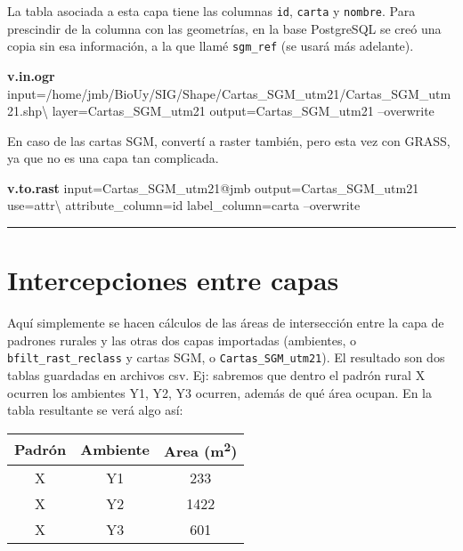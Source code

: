\documentclass[spanish,]{article}
\newenvironment{Shaded}{}{}
\newcommand{\KeywordTok}[1]{\textcolor[rgb]{0.00,0.44,0.13}{\textbf{{#1}}}}
\newcommand{\NormalTok}[1]{{#1}}
\begin{document}
La tabla asociada a esta capa tiene las columnas \texttt{id},
\texttt{carta} y \texttt{nombre}. Para prescindir de la columna con las
geometrías, en la base PostgreSQL se creó una copia sin esa información,
a la que llamé \texttt{sgm\_ref} (se usará más adelante).

\begin{Shaded}
\begin{Highlighting}[]
\KeywordTok{v.in.ogr} \NormalTok{input=/home/jmb/BioUy/SIG/Shape/Cartas_SGM_utm21/Cartas_SGM_utm21.shp\textbackslash{}}
  \NormalTok{layer=Cartas_SGM_utm21 output=Cartas_SGM_utm21 --overwrite}
\end{Highlighting}
\end{Shaded}

En caso de las cartas SGM, convertí a raster también, pero esta vez con
GRASS, ya que no es una capa tan complicada.

\begin{Shaded}
\begin{Highlighting}[]
\KeywordTok{v.to.rast} \NormalTok{input=Cartas_SGM_utm21@jmb output=Cartas_SGM_utm21 use=attr\textbackslash{}}
 \NormalTok{attribute_column=id label_column=carta --overwrite }
\end{Highlighting}
\end{Shaded}

\begin{center}\rule{0.5\linewidth}{\linethickness}\end{center}

\section{Intercepciones entre capas}\label{intercepciones-entre-capas}

Aquí simplemente se hacen cálculos de las áreas de intersección entre la
capa de padrones rurales y las otras dos capas importadas (ambientes, o
\texttt{bfilt\_rast\_reclass} y cartas SGM, o
\texttt{Cartas\_SGM\_utm21}). El resultado son dos tablas guardadas en
archivos csv. Ej: sabremos que dentro el padrón rural X ocurren los
ambientes Y1, Y2, Y3 ocurren, además de qué área ocupan. En la tabla
resultante se verá algo así:

\begin{longtable}[c]{@{}ccc@{}}
\toprule
Padrón & Ambiente & Area (m\textsuperscript{2})\tabularnewline
\midrule
\endhead
X & Y1 & 233\tabularnewline
X & Y2 & 1422\tabularnewline
X & Y3 & 601\tabularnewline
\bottomrule
\end{longtable}
\end{document}

